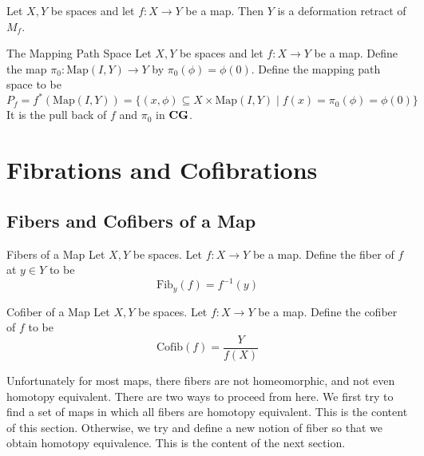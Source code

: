\documentclass[a4paper]{article}
\begin{document}
\begin{lmm}{}{} Let $X,Y$ be spaces and let $f:X\to Y$ be a map. Then $Y$ is a deformation retract of $M_f$. 
\end{lmm}

\begin{defn}{The Mapping Path Space}{} Let $X,Y$ be spaces and let $f:X\to Y$ be a map. Define the map $\pi_0:\text{Map}(I,Y)\to Y$ by $\pi_0(\phi)=\phi(0)$. Define the mapping path space to be $$P_f=f^\ast(\text{Map}(I,Y))=\{(x,\phi)\subseteq X\times\text{Map}(I,Y)\;|\;f(x)=\pi_0(\phi)=\phi(0)\}$$ It is the pull back of $f$ and $\pi_0$ in $\bold{CG}$. 
\end{defn}

\pagebreak
\section{Fibrations and Cofibrations}
\subsection{Fibers and Cofibers of a Map}
\begin{defn}{Fibers of a Map}{} Let $X,Y$ be spaces. Let $f:X\to Y$ be a map. Define the fiber of $f$ at $y\in Y$ to be $$\text{Fib}_y(f)=f^{-1}(y)$$
\end{defn}

\begin{defn}{Cofiber of a Map}{} Let $X,Y$ be spaces. Let $f:X\to Y$ be a map. Define the cofiber of $f$ to be $$\text{Cofib}(f)=\frac{Y}{f(X)}$$
\end{defn}

Unfortunately for most maps, there fibers are not homeomorphic, and not even homotopy equivalent. There are two ways to proceed from here. We first try to find a set of maps in which all fibers are homotopy equivalent. This is the content of this section. Otherwise, we try and define a new notion of fiber so that we obtain homotopy equivalence. This is the content of the next section. 
\end{document}
